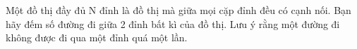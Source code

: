 Một đồ thị đầy đủ N đỉnh là đồ thị mà giữa mọi cặp đỉnh đều có cạnh nối. Bạn hãy đếm số đường đi giữa 2 đỉnh bất kì của đồ thị. Lưu ý rằng một đường đi không được đi qua một đỉnh quá một lần.